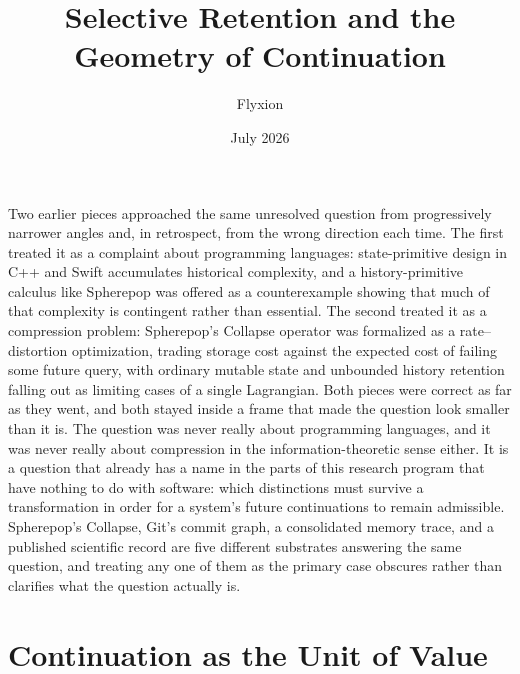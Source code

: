 \documentclass[11pt]{article}
\title{Selective Retention and the Geometry of Continuation}
\author{Flyxion}
\date{July 2026}
\begin{document}
\maketitle

Two earlier pieces approached the same unresolved question from progressively narrower angles and, in retrospect, from the wrong direction each time. The first treated it as a complaint about programming languages: state-primitive design in C++ and Swift accumulates historical complexity, and a history-primitive calculus like Spherepop was offered as a counterexample showing that much of that complexity is contingent rather than essential. The second treated it as a compression problem: Spherepop's Collapse operator was formalized as a rate--distortion optimization, trading storage cost against the expected cost of failing some future query, with ordinary mutable state and unbounded history retention falling out as limiting cases of a single Lagrangian. Both pieces were correct as far as they went, and both stayed inside a frame that made the question look smaller than it is. The question was never really about programming languages, and it was never really about compression in the information-theoretic sense either. It is a question that already has a name in the parts of this research program that have nothing to do with software: which distinctions must survive a transformation in order for a system's future continuations to remain admissible. Spherepop's Collapse, Git's commit graph, a consolidated memory trace, and a published scientific record are five different substrates answering the same question, and treating any one of them as the primary case obscures rather than clarifies what the question actually is.

\section{Continuation as the Unit of Value}
\end{document}
